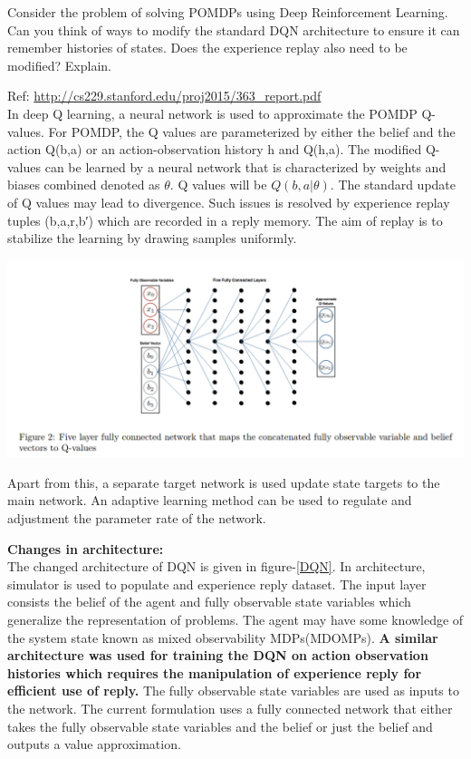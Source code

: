\documentclass[solution,addpoints,12pt]{exam}
\begin{document}
\begin{questions}
\question[3] Consider the problem of solving POMDPs using Deep Reinforcement Learning. Can you think of ways to modify the standard DQN architecture to ensure it can remember histories of states. Does the experience replay also need to be modified? Explain.

\begin{solution}
Ref: \url{ http://cs229.stanford.edu/proj2015/363_report.pdf} \\
In deep Q learning, a neural network is used to approximate the POMDP Q-values. For POMDP, the Q values are parameterized by either the belief and the action Q(b,a) or an action-observation history h and Q(h,a). The modified Q-values can be learned by a neural network that is characterized by weights and biases combined denoted as $\theta$. Q values will be $Q(b,a|\theta)$. The standard update of Q values may lead to divergence. Such issues is resolved by experience replay tuples (b,a,r,b′) which are recorded in a reply memory. The aim of replay is to stabilize the learning by drawing samples uniformly.

\begin{center}
	\includegraphics[trim={0cm 0cm 0cm 0cm},clip,scale=0.2]{DQN.png}\label{DQN}
\end{center}

Apart from this, a separate target network is used update state targets to the main network.  An adaptive learning method can be used  to  regulate and adjustment the parameter rate  of  the  network. 

\textbf{Changes in architecture:} \\
The changed architecture of DQN is given in figure-\ref{DQN}. In architecture, simulator is used to populate and experience reply dataset. The input layer consists the belief of the agent and fully observable state variables which generalize the representation of problems. The agent may have some knowledge of the system state known as mixed observability MDPs(MDOMPs). 
\textbf{A similar architecture was used for training the DQN on action observation histories which requires the manipulation of experience reply for efficient use of reply.}  The fully observable state variables are used as inputs to the network. The current formulation uses a fully connected network that either takes the fully observable state variables and the belief or just the belief  and outputs a value approximation.
\end{solution}



\end{questions}
\end{document}
